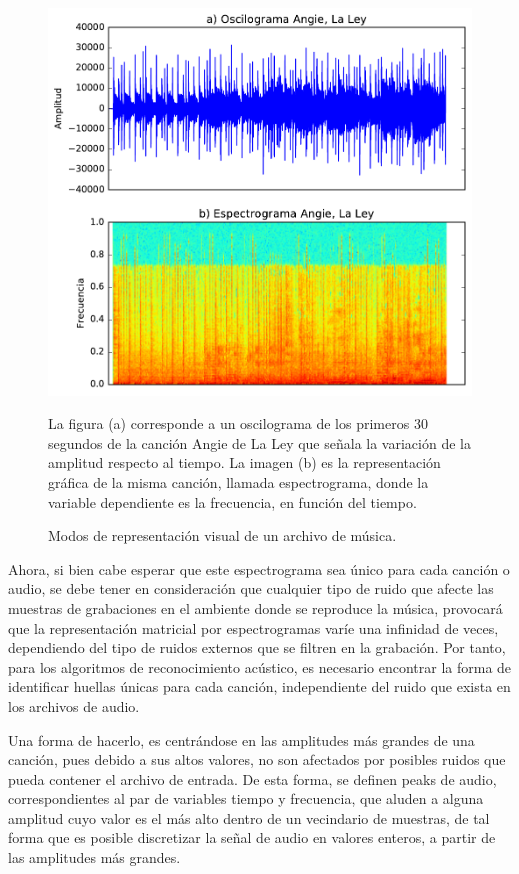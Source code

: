 \begin{figure}[h!]
    \centering
    \includegraphics[scale=0.7]{graficos/Angie30Sec.pdf}
    \caption{Modos de representación visual de un archivo de música.}{La figura (a) corresponde a un oscilograma de los primeros 30 segundos de la canción Angie de La Ley que señala la variación de la amplitud respecto al tiempo. La imagen (b) es la representación gráfica de la misma canción, llamada espectrograma, donde la variable dependiente es la frecuencia, en función del tiempo.}
    \label{fig:Angie30Sec}
\end{figure}

Ahora, si bien cabe esperar que este espectrograma sea único para cada canción o audio, se debe tener en consideración que cualquier tipo de ruido que afecte las muestras de grabaciones en el ambiente donde se reproduce la música, provocará que la representación matricial por espectrogramas varíe una infinidad de veces, dependiendo del tipo de ruidos externos que se filtren en la grabación. Por tanto, para los algoritmos de reconocimiento acústico, es necesario encontrar la forma de identificar huellas únicas para cada canción, independiente del ruido que exista en los archivos de audio.

Una forma de hacerlo, es centrándose en las amplitudes más grandes de una canción, pues debido a sus altos valores, no son afectados por posibles ruidos que pueda contener el archivo de entrada. De esta forma, se definen peaks de audio, correspondientes al par de variables tiempo y frecuencia, que aluden a alguna amplitud cuyo valor es el más alto dentro de un vecindario de muestras, de tal forma que es posible discretizar la señal de audio en valores enteros, a partir de las amplitudes más grandes.

